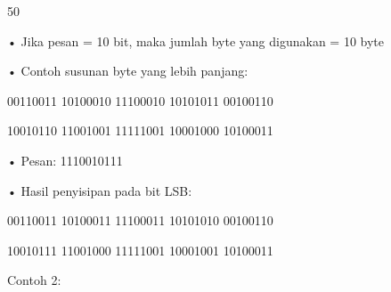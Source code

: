 \documentclass{article}
\begin{document}

50

• Jika pesan = 10 bit, maka jumlah byte yang digunakan = 10 byte

• Contoh susunan byte yang lebih panjang:

 00110011  10100010   11100010    10101011  00100110

 10010110  11001001   11111001    10001000  10100011

• Pesan: 1110010111

• Hasil penyisipan pada bit LSB:

 00110011  10100011   11100011   10101010  00100110

 10010111  11001000   11111001    10001001  10100011  

Contoh 2:
\end{document}
